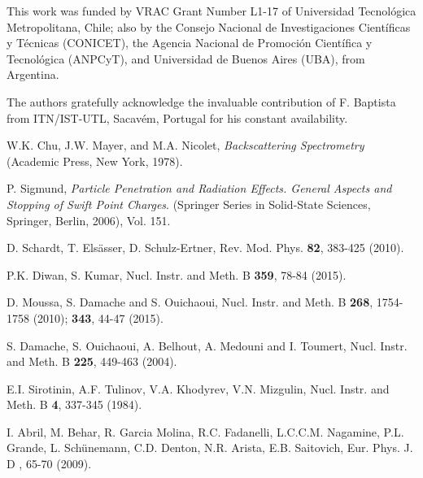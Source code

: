 \documentclass[aps,pra,reprint,superscriptaddress]{revtex4-1}
\begin{document}
\begin{acknowledgments}
This work was funded by VRAC Grant Number L1-17 of Universidad 
Tecnol\'ogica Metropolitana, Chile; also by the Consejo Nacional de 
Investigaciones Cient\'ificas y T\'ecnicas (CONICET), the Agencia 
Nacional de Promoci\'on Cient\'ifica y Tecnol\'ogica (ANPCyT), and 
Universidad de Buenos Aires (UBA), from Argentina.

The authors gratefully acknowledge the invaluable contribution of F. 
Baptista from ITN/IST-UTL, Sacav\'{e}m, Portugal for his constant 
availability. 
\end{acknowledgments}
\begin{thebibliography}{00}
W.K. Chu, J.W. Mayer, and M.A. Nicolet,
\textit{Backscattering Spectrometry}
(Academic Press, New York, 1978).

P. Sigmund, 
\textit{Particle Penetration and Radiation Effects. General Aspects and 
Stopping of Swift Point Charges}.
(Springer Series in Solid-State Sciences, Springer, Berlin, 2006), Vol. 151.

D. Schardt, T. Els\"asser, D. Schulz-Ertner, 
Rev. Mod. Phys. \textbf{82},  383-425 (2010).

P.K. Diwan, S. Kumar, 
Nucl. Instr. and Meth. B \textbf{359}, 78-84 (2015).

D. Moussa, S. Damache and S. Ouichaoui, 
Nucl. Instr. and Meth. B \textbf{268}, 1754-1758 (2010); 
\textbf{343},  44-47 (2015).

S. Damache, S. Ouichaoui, A. Belhout, A. Medouni and I. Toumert, 
Nucl. Instr. and Meth. B \textbf{225}, 449-463 (2004).

E.I. Sirotinin, A.F. Tulinov, V.A. Khodyrev, V.N. Mizgulin, 
Nucl. Instr. and Meth. B \textbf{4}, 337-345 (1984).

I. Abril, M. Behar, R. Garcia Molina, R.C. Fadanelli, L.C.C.M. Nagamine, 
P.L. Grande, L. Sch\"unemann, C.D. Denton, N.R. Arista, E.B. Saitovich,
Eur. Phys. J. D , 65-70 (2009).


\end{thebibliography}
\end{document}
